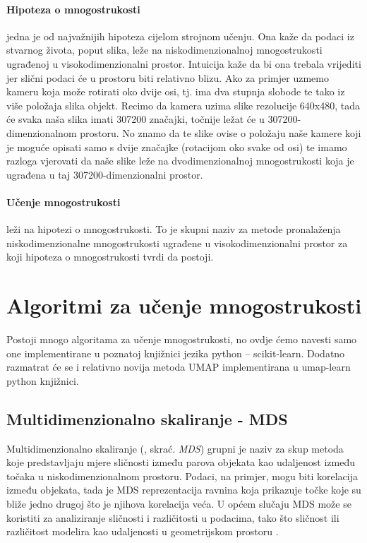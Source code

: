 \documentclass[times, utf8, diplomski]{fer}
\begin{document}
\paragraph{Hipoteza o mnogostrukosti} jedna je od najvažnijih hipoteza cijelom strojnom učenju. Ona kaže da podaci iz stvarnog života, poput slika, leže na niskodimenzionalnoj mnogostrukosti ugrađenoj u visokodimenzionalni prostor. Intuicija kaže da bi ona trebala vrijediti jer slični podaci će u prostoru biti relativno blizu. Ako za primjer uzmemo kameru koja može rotirati oko dvije osi, tj. ima dva stupnja slobode te tako iz više položaja slika objekt. Recimo da kamera uzima slike rezolucije 640x480, tada će svaka naša slika imati 307200 značajki, točnije ležat će u 307200-dimenzionalnom prostoru. No znamo da te slike ovise o položaju naše kamere koji je moguće opisati samo s dvije značajke (rotacijom oko svake od osi) te imamo razloga vjerovati da naše slike leže na dvodimenzionalnoj mnogostrukosti koja je ugrađena u taj 307200-dimenzionalni prostor.

\paragraph{Učenje mnogostrukosti} leži na hipotezi o mnogostrukosti. To je skupni naziv za metode pronalaženja niskodimenzionalne mnogostrukosti ugrađene u visokodimenzionalni prostor za koji hipoteza o mnogostrukosti tvrdi da postoji.

\section{Algoritmi za učenje mnogostrukosti}

Postoji mnogo algoritama za učenje mnogostrukosti, no ovdje ćemo navesti samo one implementirane u poznatoj knjižnici jezika python – scikit-learn. Dodatno razmatrat će se i relativno novija metoda UMAP implementirana u umap-learn python knjižnici.

\subsection{Multidimenzionalno skaliranje - MDS}

Multidimenzionalno skaliranje (, skrać. \emph{MDS}) grupni je naziv za skup metoda koje predstavljaju mjere sličnosti između parova objekata kao udaljenost između točaka u niskodimenzionalnom prostoru. Podaci, na primjer, mogu biti korelacija između objekata, tada je MDS reprezentacija ravnina koja prikazuje točke koje su bliže jedno drugoj što je njihova korelacija veća. U općem slučaju MDS može se koristiti za analiziranje sličnosti i različitosti u podacima, tako što sličnost ili različitost modelira kao udaljenosti u geometrijskom prostoru \citep{borg2005modern}.
\end{document}
